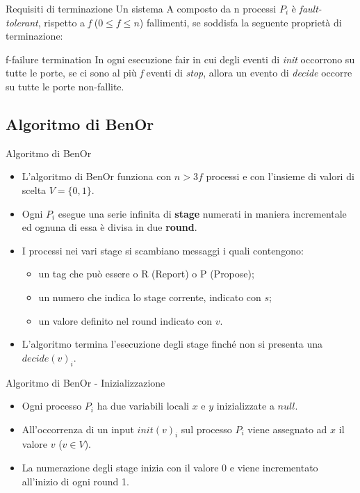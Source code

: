 \documentclass{beamer}
\begin{document}
\begin{frame}{Requisiti di terminazione}
    Un sistema A composto da n processi $P_{i}$ è \textit{fault-tolerant}, rispetto a \textit{f} ($0 \leq f \leq n$) fallimenti, se soddisfa la seguente proprietà di terminazione: 
    \begin{block}{f-failure termination}
    In ogni esecuzione fair in cui degli eventi di \textit{init} occorrono su tutte le porte, se ci sono al più \textit{f} eventi di \textit{stop}, allora un evento di \textit{decide} occorre su tutte le porte non-fallite. 
    \end{block}
\end{frame}

\subsection{Algoritmo di BenOr}
\begin{frame}{Algoritmo di BenOr}
    \begin{itemize}
        \item L'algoritmo di BenOr funziona con $n > 3f$ processi e con l'insieme di valori di scelta $V = \{0, 1\}$.
        
        \item Ogni $P_{i}$ esegue una serie infinita di \textbf{stage} numerati in maniera incrementale ed ognuna di essa è divisa in due \textbf{round}.
        
        \item I processi nei vari stage si scambiano messaggi i quali contengono:
            \begin{itemize}
                \item un tag che può essere o R (Report) o P (Propose);
                \item un numero che indica lo stage corrente, indicato con $s$;
                \item un valore definito nel round indicato con $v$.
            \end{itemize}
            
        \item L'algoritmo termina l'esecuzione degli stage finché non si presenta una $decide(v)_{i}$.
    \end{itemize}
\end{frame}

\begin{frame}{Algoritmo di BenOr - Inizializzazione}
    \begin{itemize}
        \item Ogni processo $P_{i}$ ha due variabili locali $x$ e $y$ inizializzate a $null$. 
        
        \item All'occorrenza di un input $init(v)_{i}$ sul processo $P_{i}$ viene assegnato ad $x$ il valore $v$ ($v \in V$).
        
        \item La numerazione degli stage inizia con il valore 0 e viene incrementato all'inizio di ogni round 1.
    \end{itemize}
\end{frame}
\end{document}
